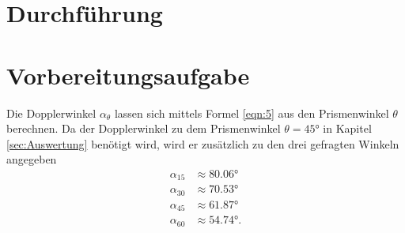 \section{Durchführung}
\label{sec:Durchführung}
\section{Vorbereitungsaufgabe}
\label{sec:vorbereitung}
Die Dopplerwinkel $\alpha_{\theta}$ lassen sich mittels Formel \eqref{eqn:5} aus den Prismenwinkel $\theta$ berechnen. Da der Dopplerwinkel zu dem
Prismenwinkel $\theta=45°$ in Kapitel \ref{sec:Auswertung} benötigt wird, wird er zusätzlich zu den drei gefragten Winkeln angegeben 
\begin{align*}
\alpha_{15}&\approx 80.06°\\    
\alpha_{30}&\approx 70.53°\\
\alpha_{45}&\approx 61.87°\\
\alpha_{60}&\approx 54.74°  .
\end{align*}